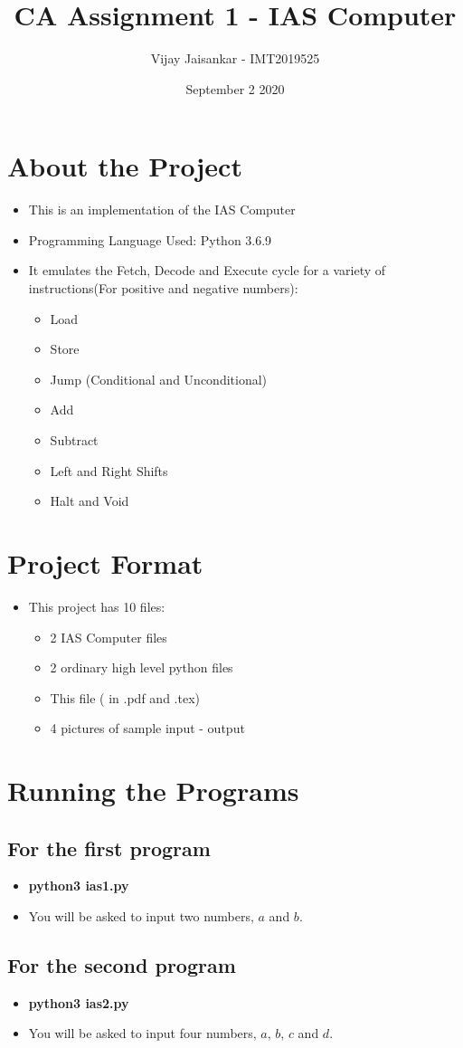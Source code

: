 \documentclass{article}
\title{CA Assignment 1 - IAS Computer}
\author{Vijay Jaisankar - IMT2019525}
\date{September 2 2020}
\begin{document}
\maketitle
\newpage

\section{About the Project}
\begin{itemize}
    \item This is an implementation of the IAS Computer
    \item Programming Language Used: Python 3.6.9
    \item It emulates the Fetch, Decode and Execute cycle for a variety of instructions(For positive and negative numbers):
    \begin{itemize}
        \item Load
        \item Store
        \item Jump (Conditional and Unconditional)
        \item Add
        \item Subtract
        \item Left and Right Shifts
        \item Halt and Void
    \end{itemize}
\end{itemize}

\section{Project Format}
\begin{itemize}
    \item This project has 10 files:
    \begin{itemize}
        \item 2 IAS Computer files
        \item 2 ordinary high level python files
        \item This file ( in .pdf and .tex)
        \item 4 pictures of sample input - output
    \end{itemize}
\end{itemize}

\section{Running the Programs}
\subsection{For the first program}
\begin{itemize}
    \item \textbf{python3 ias1.py}
    \item You will be asked to input two numbers, $a$ and $b$.
\end{itemize}

\subsection{For the second program}
\begin{itemize}
    \item \textbf{python3 ias2.py}
    \item You will be asked to input four numbers, $a$, $b$, $c$ and $d$.
\end{itemize}
\end{document}
